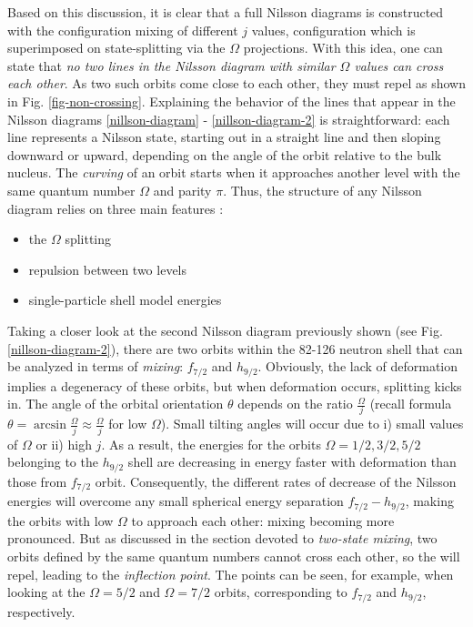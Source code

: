 Based on this discussion, it is clear that a full Nilsson diagrams is constructed with the configuration mixing of different $j$ values, configuration which is superimposed on state-splitting via the $\Omega$ projections. With this idea, one can state that \emph{no two lines in the Nilsson diagram with similar $\Omega$ values can cross each other}. As two such orbits come close to each other, they must repel as shown in Fig. \ref{fig-non-crossing}. Explaining the behavior of the lines that appear in the Nilsson diagrams \ref{nillson-diagram} - \ref{nillson-diagram-2} is straightforward: each line represents a Nilsson state, starting out in a straight line and then sloping downward or upward, depending on the angle of the orbit relative to the bulk nucleus. The \emph{curving} of an orbit starts when it approaches another level with the same quantum number $\Omega$ and parity $\pi$. Thus, the structure of any Nilsson diagram relies on three main features \cite{casten2000nuclear}:
\begin{itemize}
    \item the $\Omega$ splitting
    \item repulsion between two levels
    \item single-particle shell model energies
\end{itemize}

Taking a closer look at the second Nilsson diagram previously shown (see Fig. \ref{nillson-diagram-2}), there are two orbits within the 82-126 neutron shell that can be analyzed in terms of \emph{mixing}: $f_{7/2}$ and $h_{9/2}$. Obviously, the lack of deformation implies a degeneracy of these orbits, but when deformation occurs, splitting kicks in. The angle of the orbital orientation $\theta$ depends on the ratio $\frac{\Omega}{j}$ (recall formula $\theta=\arcsin\frac{\Omega}{j}\approx\frac{\Omega}{j}$ for low $\Omega$). 
Small tilting angles will occur due to i) small values of $\Omega$ or ii) high $j$. As a result, the energies for the orbits $\Omega=1/2,3/2,5/2$ belonging to the $h_{9/2}$ shell are decreasing in energy faster with deformation than those from $f_{7/2}$ orbit. Consequently, the different rates of decrease of the Nilsson energies will overcome any small spherical energy separation $f_{7/2}-h_{9/2}$, making the orbits with low $\Omega$ to approach each other: mixing becoming more pronounced.
But as discussed in the section devoted to \emph{two-state mixing}, two orbits defined by the same quantum numbers cannot cross each other, so the will repel, leading to the \emph{inflection point}. The points can be seen, for example, when looking at the $\Omega=5/2$ and $\Omega=7/2$ orbits, corresponding to $f_{7/2}$ and $h_{9/2}$, respectively.

